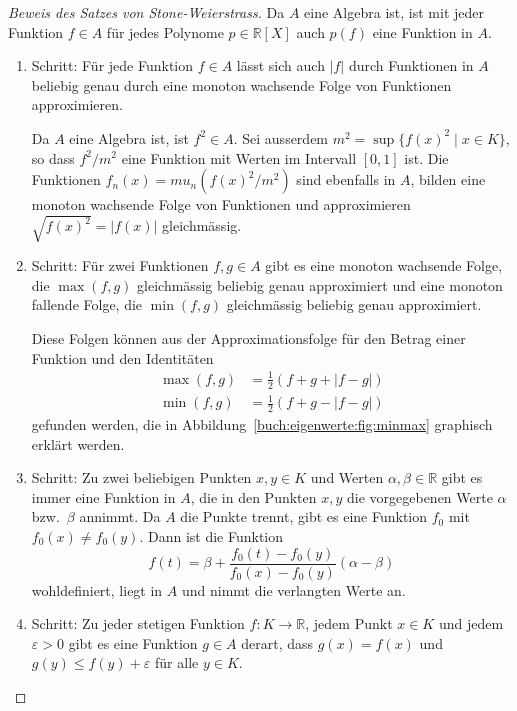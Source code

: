 \begin{proof}[Beweis des Satzes von Stone-Weierstrass]
%
%
Da $A$ eine Algebra ist, ist mit jeder Funktion $f\in A$ für jedes Polynome
$p\in\mathbb{R}[X]$ auch $p(f)$ eine Funktion in $A$.
\begin{enumerate}
\item Schritt: Für jede Funktion $f\in A$ lässt sich auch $|f|$ durch
Funktionen in $A$ beliebig genau durch eine monoton wachsende Folge
von Funktionen approximieren.

Da $A$ eine Algebra ist, ist $f^2\in A$.
Sei ausserdem $m^2=\sup \{f(x)^2 \mid x\in K\}$, so dass $f^2/m^2$ eine Funktion
mit Werten im Intervall $[0,1]$ ist.
Die Funktionen $f_n(x)=mu_n(f(x)^2/m^2)$ sind ebenfalls in $A$,
bilden eine monoton wachsende Folge von Funktionen und
approximieren $\sqrt{f(x)^2}=|f(x)|$ gleichmässig.

\item Schritt: Für zwei Funktionen $f,g\in A$ gibt es eine monoton wachsende
Folge, die $\max(f,g)$ gleichmässig beliebig genau approximiert
und eine monoton fallende Folge, die $\min(f,g)$ gleichmässig beliebig 
genau approximiert.

Diese Folgen können aus der Approximationsfolge für den Betrag einer
Funktion und den Identitäten
\begin{equation}
\begin{aligned}
\max(f,g) &= \frac12(f+g+|f-g|) \\
\min(f,g) &= \frac12(f+g-|f-g|) 
\end{aligned}
\label{buch:eigenwerte:eqn:minmax}
\end{equation}
gefunden werden, die in Abbildung~\ref{buch:eigenwerte:fig:minmax}
graphisch erklärt werden.

\item Schritt: Zu zwei beliebigen Punkten $x,y\in K$ und Werten
$\alpha,\beta\in\mathbb{R}$ gibt es immer eine Funktion in $A$,
die in den Punkten $x,y$ die vorgegebenen Werte $\alpha$ bzw.~$\beta$
annimmt.
Da $A$ die Punkte trennt, gibt es eine Funktion $f_0$ mit $f_0(x)\ne f_0(y)$.
Dann ist die Funktion
\[
f(t)
=
\beta + \frac{f_0(t)-f_0(y)}{f_0(x)-f_0(y)}(\alpha-\beta)
\]
wohldefiniert, liegt in $A$ und nimmt die verlangten Werte an.

\item Schritt: Zu jeder stetigen Funktion $f\colon K\to\mathbb{R}$, jedem
Punkt $x\in K$ und jedem $\varepsilon>0$ gibt es eine Funktion $g\in A$ derart,
dass $g(x)=f(x)$ und $g(y) \le f(y)+\varepsilon$ für alle $y\in K$.


\end{enumerate}
\end{proof}
